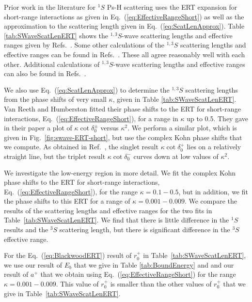 \documentclass[preprint,showpacs,showkeys,preprintnumbers,amsmath,amssymb,longbibliography,pra,aps]{revtex4-1}
\begin{document}
Prior work in the literature for $^1S$ Ps-H scattering
\cite{Blackwood2002,Ivanov2002,VanReeth2003}
uses the ERT expansion for short-range interactions as
given in Eq.~(\ref{eq:EffectiveRangeShort}) as well as the
approximation to the scattering length given in Eq.~(\ref{eq:ScatLenApprox}).
Table \ref{tab:SWaveScatLenERT} shows the $^{1,3}S$-wave
scattering lengths and effective ranges given by
Refs.~\cite{Blackwood2002,Ivanov2002,VanReeth2003,Walters2004}.
Some other calculations of the $^{1,3}S$ scattering lengths and
effective ranges can be found in
Refs.~\cite{Sinha2000,Ivanov2001,Chiesa2002,Ivanov2002}.
These all agree reasonably well with each other. Additional calculations
of $^{1,3}S$-wave scattering lengths and effective ranges can also be found in
Refs.~\cite{Hara1975,Page1976,Drachman1975,
Drachman1976,Campbell1998,Adhikari1999,Adhikari2001b}.

We also use Eq.~(\ref{eq:ScatLenApprox}) to determine the $^{1,3}S$
scattering lengths from the phase shifts of very small $\kappa$, given
in Table \ref{tab:SWaveScatLenERT}. Van Reeth and Humberston
\cite{VanReeth2003} fitted their phase shifts to the ERT for short-range
interactions, Eq.~(\ref{eq:EffectiveRangeShort}), for a range in $\kappa$
up to 0.5. They gave in their paper a plot of $\kappa \cot \delta_0^\pm$
versus $\kappa^2$. We perform a similar plot, which is given in
Fig.~\ref{fig:swave-ERT-short}, but use the complex Kohn phase shifts
that we compute. As obtained in Ref.~\cite{VanReeth2003}, the singlet
result $\kappa \cot \delta_0^+$ lies on a relatively straight line, but
the triplet result $\kappa \cot \delta_0^-$ curves down at low
values of $\kappa^2$.

We investigate the low-energy region in more detail. We fit the
complex Kohn phase shifts to the ERT for short-range interactions,
Eq.~(\ref{eq:EffectiveRangeShort}), for the range $\kappa = 0.1 - 0.5$, but
in addition, we fit the phase shifts to this ERT for a range of
$\kappa = 0.001 - 0.009$. We compare the results of the scattering lengths
and effective ranges for the two fits in Table~\ref{tab:SWaveScatLenERT}.
We find that there is little difference in the $^1S$ results and the $^3S$
scattering length, but there is significant difference in the $^3S$
effective range.

For the Eq.~(\ref{eq:BlackwoodERT}) result of $r_0^+$ in
Table~\ref{tab:SWaveScatLenERT}, we use our result of $E_b$ that we give
in Table \ref{tab:BoundEnergy} and and our result of $a^+$ that we obtain
using Eq.~(\ref{eq:EffectiveRangeShort}) for the range $\kappa = 0.001 - 0.009$.
This value of $r_0^+$ is smaller than the other values of $r_0^+$ that we
give in Table~\ref{tab:SWaveScatLenERT}.
\end{document}
